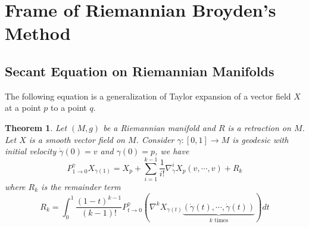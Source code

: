 \documentclass[12pt,a4paper,draft]{article}  %
\newtheorem{theorem}{Theorem}[section]
\theoremstyle{definition}
\numberwithin{equation}{section}
\begin{document}
\section{Frame of Riemannian Broyden's Method}
\subsection{Secant Equation on Riemannian Manifolds}
The following equation is a generalization of Taylor expansion of a vector field $X$ at a point $p$ to a point $q$.
\begin{theorem}\label{taylor_expansion_vector_field}
        Let $(M,g)$ be a Riemannian manifold and $R$ is a retraction on $M$. Let $X$ is a smooth vector field on $M$. Consider $\gamma: [0,1] \to M$ is geodesic with initial velocity $\dot{\gamma}(0) = v$ and $\gamma(0) = p$, we have
        \begin{equation}
                P_{1\to0}^\gamma X_{\gamma(1)} = X_p + \sum_{i=1}^{k-1}\frac{1}{i!} \nabla^i_{\dot{\gamma}} X_p(v,\cdots,v) + R_k
        \end{equation}
        where $R_k$ is the remainder term 
        \[
        R_k = \int_0^1 \frac{(1-t)^{k-1}}{(k-1)!} P_{t\to0}^\gamma \left(\nabla^kX_{\gamma(t)}\underbrace{(\dot{\gamma}(t),\cdots,\dot{\gamma}(t))}_{k\text{ times}}\right) dt
        \]
\end{theorem}
\end{document}
